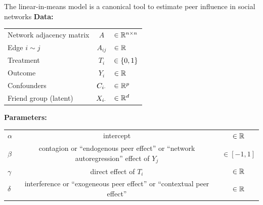 \documentclass[final]{beamer}
\newlength{\colwidth}
\begin{document}
\begin{frame}[t]
\begin{columns}[t]
\begin{column}{\colwidth}
\begin{block}{The linear-in-means model is a canonical tool to estimate peer influence in social networks}
                \textbf{Data:}
                \begin{table}[]
                    \begin{tabular}{lcl}
                        Network adjacency matrix & $A$            & $\in \mathbb{R}^{n \times n}$ \\
                        Edge $i \sim j$          & $A_{ij}$       & $\in \mathbb{R}$              \\
                        Treatment                & $T_i$          & $\in \{0, 1\} $     \\
                        Outcome                  & $Y_i$          & $\in \mathbb{R}$              \\
                        Confounders              & $C_{i \cdot}$ & $\in \mathbb{R}^p$            \\
                        Friend group (latent)    & $X_{i \cdot}$ & $\in \mathbb{R}^d$
                    \end{tabular}
                \end{table}

                \textbf{Parameters:}
                \begin{table}[]
                    \begin{tabular}{lcc}
                        $\alpha$ & intercept                                                                             & $\in \mathbb{R}$      \\
                        $\beta$  & contagion or ``endogenous peer effect'' or ``network autoregression'' effect of $Y_j$ & $\in [-1, 1]$ \\
                        $\gamma$ & direct effect of $T_i$                                                                & $\in \mathbb{R}$      \\
                        $\delta$ & interference or ``exogeneous peer effect'' or ``contextual peer effect''              & $\in \mathbb{R}$
                    \end{tabular}
                \end{table}



\end{block}
\end{column}
\end{columns}
\end{frame}
\end{document}
